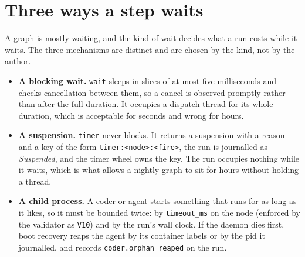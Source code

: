 \section{Three ways a step waits}

A graph is mostly waiting, and the kind of wait decides what a run costs while it waits. The three
mechanisms are distinct and are chosen by the kind, not by the author.

\begin{center}
\end{center}

\begin{itemize}
	\item \textbf{A blocking wait.} \texttt{wait} sleeps in slices of at most five milliseconds and
	checks cancellation between them, so a cancel is observed promptly rather than after the full
	duration. It occupies a dispatch thread for its whole duration, which is acceptable for seconds
	and wrong for hours.
	\item \textbf{A suspension.} \texttt{timer} never blocks. It returns a suspension with a reason
	and a key of the form \texttt{timer:<node>:<fire>}, the run is journalled as \emph{Suspended}, and
	the timer wheel owns the key. The run occupies nothing while it waits, which is what allows a
	nightly graph to sit for hours without holding a thread.
	\item \textbf{A child process.} A coder or agent starts something that runs for as long as it
	likes, so it must be bounded twice: by \texttt{timeout\_ms} on the node (enforced by the
	validator as \texttt{V10}) and by the run's wall clock. If the daemon dies first, boot recovery
	reaps the agent by its container labels or by the pid it journalled, and records
	\texttt{coder.orphan\_reaped} on the run.
\end{itemize}

